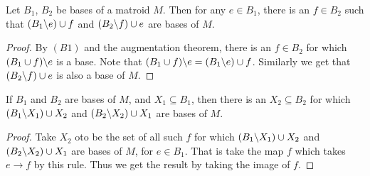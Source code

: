 \begin{proposition}\label{1.4.4}
    Let $ B_1$, $ B_2$ be bases of a matroid $M$. Then for any  $e \in B_1$, there is an $f \in B_2$
    such that $(B_1\backslash e) \cup f$ and $(B_2\backslash f) \cup e$ are bases of $M$.
\end{proposition}
\begin{proof}
    By $(B1)$ and the augmentation theorem, there is an $f \in B_2$ for which $(B_1 \cup
    f)\backslash e$ is a base. Note that $(B_1 \cup f)\backslash e=(B_1\backslash e) \cup f$. Similarly we get
    that $(B_2\backslash f) \cup e$ is also a base of  $M$.
\end{proof}
\begin{corollary}
    If $ B_1$ and $ B_2$ are bases of $M$, and  $X_1 \subseteq B_1$, then there is an $ X_2
    \subseteq B_2$ for which $(B_1\backslash X_1) \cup X_2$ and $(B_2\backslash X_2) \cup X_1$ are bases of $M$.	
\end{corollary}
\begin{proof}
    Take $ X_2$ oto be the set of all such $f$ for which $(B_1\backslash X_1) \cup X_2$ and 
    $(B_2\backslash X_2) \cup X_1$ are bases of $M$, for $e \in B_1$. That is take the map $f$ which
    takes  $e \rightarrow f$ by this rule. Thus we get the result by taking the image of $f$.
\end{proof}
